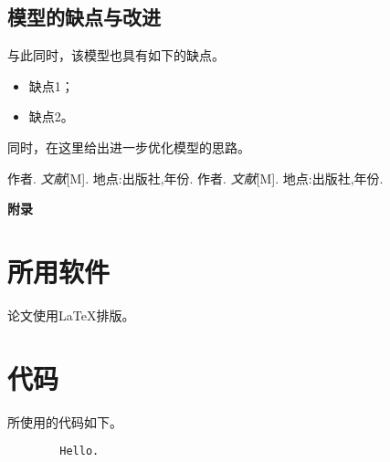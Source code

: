 \documentclass[12pt, a4paper, oneside]{ctexart}
\renewcommand{\thesection}{\zhnum{section}}
\begin{document}
\subsection{模型的缺点与改进}

与此同时，该模型也具有如下的缺点。
\begin{itemize}
    \item 缺点1；
    \item 缺点2。
\end{itemize}
同时，在这里给出进一步优化模型的思路。

\begin{thebibliography}{99}
    作者. \emph{文献}[M]. 地点:出版社,年份.
    作者. \emph{文献}[M]. 地点:出版社,年份.
\end{thebibliography}

\begin{center}
    \Large{\textbf{附录}}
\end{center}

\begin{appendices}
    \renewcommand{\thesection}{\Alph{section}}
    \section{所用软件}
        论文使用\LaTeX 排版。
    \section{代码}
        所使用的代码如下。
	\begin{lstlisting}
		Hello. 
	\end{lstlisting}
\end{appendices}
\end{document}
